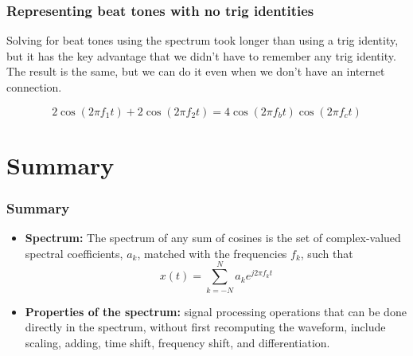 \documentclass{beamer}
\begin{document}
\begin{frame}
  \frametitle{Representing beat tones with no trig identities}

  Solving for beat tones using the spectrum took longer than using a
  trig identity, but it has the key advantage that we didn't have to
  remember any trig identity.  The result is the same, but we can do
  it even when we don't have an internet connection.
  
  \[
  2\cos(2\pi f_1t)+2\cos(2\pi f_2 t) = 4\cos(2\pi f_{b}t)\cos(2\pi f_{c}t)
  \]
\end{frame}


\section[Summary]{Summary}
\setcounter{subsection}{1}

\begin{frame}
  \frametitle{Summary}
  \begin{itemize}
  \item {\bf Spectrum:} The spectrum of any sum of cosines is the set
    of complex-valued spectral coefficients, $a_k$, matched with the
    frequencies $f_k$, such that
    \[
    x(t) = \sum_{k=-N}^N a_ke^{j2\pi f_kt}
    \]
  \item {\bf Properties of the spectrum:} signal processing operations
    that can be done directly in the spectrum, without first
    recomputing the waveform, include scaling, adding, time shift,
    frequency shift, and differentiation.
  \end{itemize}
  
\end{frame}
\end{document}
